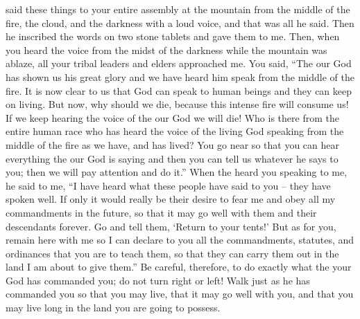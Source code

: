 {{}
said
these
things
to
your entire
assembly
at the mountain
from the middle
of the fire,
the cloud,
and the darkness
with a loud
voice,
and that was all
he said.
Then
he inscribed
the words
on
two
stone
tablets
and gave
them to me.
Then, when
you heard
the voice
from the midst
of the darkness
while the mountain
was ablaze,
all
your tribal
leaders
and elders
approached
me.
You said,
“The
{}
our God
has shown
us his great
glory
and we have heard
him
speak from the middle
of the fire.
It is now
clear
to us
that
God
can
speak
to human
beings
and they can keep
on living.
But now,
why
should we die,
because
this
intense
fire
will consume
us! If
we
keep
hearing
the voice
of the {}
our God
we will
die!
Who
is there from the entire
human race
who has
heard
the voice
of the living
God
speaking
from the middle
of the fire
as
we have, and has lived?
You go near
so that you
can hear
everything
the {}
our God
is saying
and then you
can tell
us
whatever
he says
to
you; then we will pay attention
and do it.”
When
the {}
heard
you speaking
to me,
he said
to me,
“I have heard
what
these
people
have
said
to you – they have spoken well.
If only
it would
really be
their desire
to fear
me and obey
all
my commandments
in the future, so that
it may
go well
with them and their descendants
forever.
Go
and tell
them, ‘Return
to your tents!’
But as for you,
remain
here
with me
so I can declare
to
you all
the commandments,
statutes,
and ordinances
that
you are to teach
them, so
that they can
carry them out
in the land
I am
about to give
them.”
Be careful,
therefore, to do
exactly
what
the {}
your God
has commanded you; do not
turn
right
or left!
Walk
just as he
has commanded
you so that
you may live,
that it may go well
with you, and that you may live long
in the land
you are going to possess.

}
